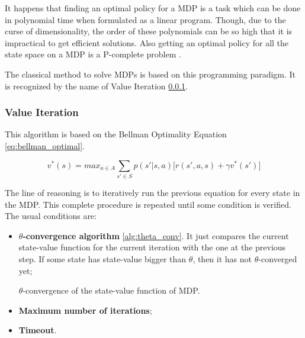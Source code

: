 It happens that finding an optimal policy for a \gls{MDP} is a task which can be
done in polynomial time \cite{littman1995complexity} when formulated as a linear
program. Though, due to the curse of dimensionality, the order of these
polynomials can be so high that it is impractical to get efficient solutions.
Also getting an optimal policy for all the state space on a \gls{MDP} is a
P-complete problem \cite{second_complexity}.

The classical method to solve \glspl{MDP} is based on this programming paradigm.
It is recognized by the name of Value Iteration \ref{subsection:value_iteration}.

\subsubsection{Value Iteration}
\label{subsection:value_iteration}

This algorithm \cite{bertsekas1987dynamic} is based on the Bellman Optimality
Equation \ref{eq:bellman_optimal}.

\begin{equation}
    v^*(s) = max_{a \in A} \sum_{s' \in S} p(s'|s,a)
    \big[r(s',a,s) + \gamma v^*(s') \big]
    \label{eq:bellman_optimal}
\end{equation}

The line of reasoning is to iteratively run
the previous equation for every state in the \gls{MDP}. This complete procedure
is repeated until some condition is verified. The usual conditions are:
\begin{itemize}
  \item \textbf{$\theta$-convergence algorithm} \ref{alg:theta_conv}. It just
  compares the current state-value function for the current iteration with the one
  at the previous step. If some state has state-value bigger than $\theta$, then
  it has not $\theta$-converged yet;

  \begin{algorithm}[H]
      \DontPrintSemicolon
  \caption{$\theta$-convergence of the state-value function of \gls{MDP}.}
  \label{alg:theta_conv}
  \end{algorithm}

  \item \textbf{Maximum number of iterations};
  \item \textbf{Timeout}.
\end{itemize}

